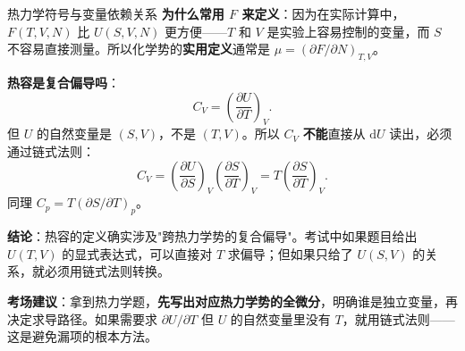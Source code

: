\begin{insightbox}{热力学符号与变量依赖关系}
\textbf{为什么常用 $F$ 来定义}：因为在实际计算中，$F(T,V,N)$ 比 $U(S,V,N)$ 更方便——$T$ 和 $V$ 是实验上容易控制的变量，而 $S$ 不容易直接测量。所以化学势的\textbf{实用定义}通常是 $\mu = (\partial F/\partial N)_{T,V}$。

\vspace{0.5em}
\textbf{热容是复合偏导吗}：
\[
  C_V = \left(\frac{\partial U}{\partial T}\right)_V .
\]
但 $U$ 的自然变量是 $(S,V)$，不是 $(T,V)$。所以 $C_V$ \textbf{不能}直接从 $\mathrm{d}U$ 读出，必须通过链式法则：
\[
  C_V = \left(\frac{\partial U}{\partial S}\right)_V\left(\frac{\partial S}{\partial T}\right)_V
      = T\left(\frac{\partial S}{\partial T}\right)_V .
\]
同理 $C_p = T(\partial S/\partial T)_p$。

\textbf{结论}：热容的定义确实涉及"跨热力学势的复合偏导"。考试中如果题目给出 $U(T,V)$ 的显式表达式，可以直接对 $T$ 求偏导；但如果只给了 $U(S,V)$ 的关系，就必须用链式法则转换。

\vspace{0.5em}
\textbf{考场建议}：拿到热力学题，\textbf{先写出对应热力学势的全微分}，明确谁是独立变量，再决定求导路径。如果需要求 $\partial U/\partial T$ 但 $U$ 的自然变量里没有 $T$，就用链式法则——这是避免漏项的根本方法。
\end{insightbox}
